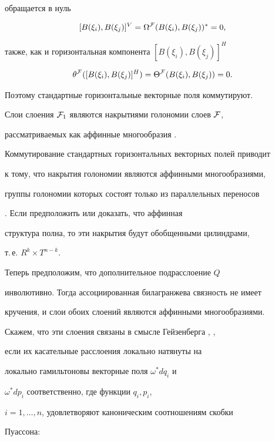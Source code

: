 обращается в нуль


$$


[B(\xi_i), B(\xi_j)]^V = \Omega^{\cal F}(B(\xi_i), B(\xi_j))^{\ast}


= 0,


$$


также, как и горизонтальная компонента $[B(\xi_i), B(\xi_j)]^H$


$$


\theta^{\cal F}( [B(\xi_i), B(\xi_j)]^H) =


\Theta^{\cal F}(B(\xi_i), B(\xi_j)) = 0.


$$


Поэтому стандартные горизонтальные векторные поля коммутируют.





Слои слоения ${\cal F}_1$ являются накрытиями голономии слоев $\cal F$,


рассматриваемых как аффинные многообразия \cite{FGH1}.


Коммутирование стандартных горизонтальных векторных полей приводит


к тому, что накрытия голономии являются аффинными многообразиями,


группы голономии которых состоят только из параллельных переносов


\cite{FGH1}. Если предположить или доказать, что аффинная


структура полна, то эти накрытия будут обобщенными цилиндрами,


т.\,е. $R^k\times T^{n-k}$.





Теперь предположим, что дополнительное подрасслоение $Q$


инволютивно. Тогда ассоциированная билагранжева связность не имеет


кручения, и слои обоих слоений являются аффинными многообразиями.


Скажем, что эти слоения связаны в смысле Гейзенберга \cite{KO}, \cite{HE},


если их касательные расслоения локально натянуты на


локально гамильтоновы векторные поля ${\omega}^*dq_i$ и


${\omega}^*dp_i$ соответственно, где функции $q_i, p_i$,


$i = 1, \dotsc, n$, удовлетворяют каноническим соотношениям скобки


Пуассона:


